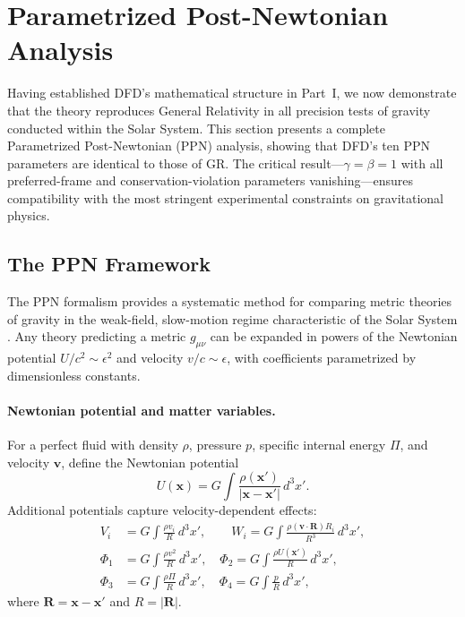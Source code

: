 
\section{Parametrized Post-Newtonian Analysis}\label{sec:ppn}

Having established DFD's mathematical structure in Part~I, we now demonstrate that the theory reproduces General Relativity in all precision tests of gravity conducted within the Solar System. This section presents a complete Parametrized Post-Newtonian (PPN) analysis, showing that DFD's ten PPN parameters are identical to those of GR. The critical result---$\gamma = \beta = 1$ with all preferred-frame and conservation-violation parameters vanishing---ensures compatibility with the most stringent experimental constraints on gravitational physics.

\subsection{The PPN Framework}\label{sec:ppn-framework}

The PPN formalism provides a systematic method for comparing metric theories of gravity in the weak-field, slow-motion regime characteristic of the Solar System \cite{Will2018,Will2014}. Any theory predicting a metric $g_{\mu\nu}$ can be expanded in powers of the Newtonian potential $U/c^2 \sim \epsilon^2$ and velocity $v/c \sim \epsilon$, with coefficients parametrized by dimensionless constants.

\paragraph{Newtonian potential and matter variables.}
For a perfect fluid with density $\rho$, pressure $p$, specific internal energy $\Pi$, and velocity $\mathbf{v}$, define the Newtonian potential
\begin{equation}\label{eq:ppn-U}
U(\mathbf{x}) = G \int \frac{\rho(\mathbf{x}')}{|\mathbf{x} - \mathbf{x}'|}\, d^3x'.
\end{equation}
Additional potentials capture velocity-dependent effects:
\begin{align}
V_i &= G \int \frac{\rho v_i}{R}\, d^3x', \qquad
W_i = G \int \frac{\rho (\mathbf{v} \cdot \mathbf{R}) R_i}{R^3}\, d^3x', \\
\Phi_1 &= G \int \frac{\rho v^2}{R}\, d^3x', \quad
\Phi_2 = G \int \frac{\rho U(\mathbf{x}')}{R}\, d^3x', \\
\Phi_3 &= G \int \frac{\rho \Pi}{R}\, d^3x', \quad
\Phi_4 = G \int \frac{p}{R}\, d^3x',
\end{align}
where $\mathbf{R} = \mathbf{x} - \mathbf{x}'$ and $R = |\mathbf{R}|$.

